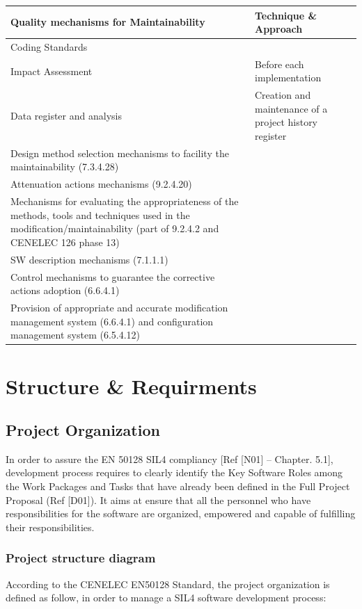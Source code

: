 \documentclass{template/openetcs_article}
\begin{document}
\begin{flushleft}
\tablefirsthead{}
\tablehead{}
\tabletail{}
\tablelasttail{}
\begin{supertabular}{|m{7cm}|m{7cm}|}
\hline
{}
Quality mechanisms for Maintainability &
Technique \& Approach\\\hline
Coding Standards &
~
\\\hline
Impact Assessment &
Before each implementation\\\hline
Data register and analysis &
Creation and maintenance of a project history register\\\hline
Design method selection mechanisms to facility the maintainability (7.3.4.28) &
~
\\\hline
Attenuation actions mechanisms (9.2.4.20) &
~
\\\hline
Mechanisms for evaluating the appropriateness of the methods, tools and techniques used in the modification/maintainability (part of 9.2.4.2 and CENELEC 126 phase 13) &
~
\\\hline
SW description mechanisms (7.1.1.1) &
~
\\\hline
Control mechanisms to guarantee the corrective actions adoption (6.6.4.1) &
~
\\\hline
Provision of appropriate and accurate modification management system (6.6.4.1) and configuration management system (6.5.4.12) &
~
\\\hline
\end{supertabular}
\end{flushleft}


\section{Structure \& Requirments}

\subsection{Project Organization}
In order to assure the EN 50128 SIL4 compliancy [Ref [N01] -- Chapter. 5.1], development process requires to clearly identify the Key Software Roles among the Work Packages and Tasks that have already been defined in the Full Project Proposal (Ref [D01]). It aims at ensure that all the personnel who have responsibilities for the software are organized, empowered and capable of fulfilling their responsibilities.



\subsubsection{Project structure diagram}
According to the CENELEC EN50128 Standard, the project organization is defined as follow, in order to manage a SIL4 software development process:
\end{document}
